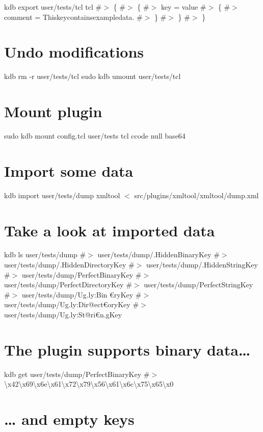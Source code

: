 kdb export user/tests/tcl tcl \#$>$ \{ \#$>$ \{ \#$>$ key = value \#$>$ \{ \#$>$ comment = Thiskeycontainsexampledata. \#$>$ \} \#$>$ \} \#$>$ \}\hypertarget{autotoc_md666_autotoc_md675}{}\section{Undo modifications}\label{autotoc_md666_autotoc_md675}
kdb rm -\/r user/tests/tcl sudo kdb umount user/tests/tcl 
\begin{DoxyCode}{0}
\DoxyCodeLine{}
\end{DoxyCode}
 \hypertarget{autotoc_md666_autotoc_md676}{}\section{Mount plugin}\label{autotoc_md666_autotoc_md676}
sudo kdb mount config.\+tcl user/tests tcl ccode null base64\hypertarget{autotoc_md666_autotoc_md677}{}\section{Import some data}\label{autotoc_md666_autotoc_md677}
kdb import user/tests/dump xmltool $<$ src/plugins/xmltool/xmltool/dump.\+xml\hypertarget{autotoc_md666_autotoc_md678}{}\section{Take a look at imported data}\label{autotoc_md666_autotoc_md678}
kdb ls user/tests/dump \#$>$ user/tests/dump/.Hidden\+Binary\+Key \#$>$ user/tests/dump/.Hidden\+Directory\+Key \#$>$ user/tests/dump/.Hidden\+String\+Key \#$>$ user/tests/dump/\+Perfect\+Binary\+Key \#$>$ user/tests/dump/\+Perfect\+Directory\+Key \#$>$ user/tests/dump/\+Perfect\+String\+Key \#$>$ user/tests/dump/\+Ug.\+ly\+:Bin{\itshape } €ry\+Key \#$>$ user/tests/dump/\+Ug.\+ly\+:Dir@ect€ory\+Key \#$>$ user/tests/dump/\+Ug.\+ly\+:St@ri€n.\+g\+Key\hypertarget{autotoc_md666_autotoc_md679}{}\section{The plugin supports binary data…}\label{autotoc_md666_autotoc_md679}
kdb get user/tests/dump/\+Perfect\+Binary\+Key \#$>$ \textbackslash{}x42\textbackslash{}x69\textbackslash{}x6e\textbackslash{}x61\textbackslash{}x72\textbackslash{}x79\textbackslash{}x56\textbackslash{}x61\textbackslash{}x6c\textbackslash{}x75\textbackslash{}x65\textbackslash{}x0\hypertarget{autotoc_md666_autotoc_md680}{}\section{… and empty keys}\label{autotoc_md666_autotoc_md680}
